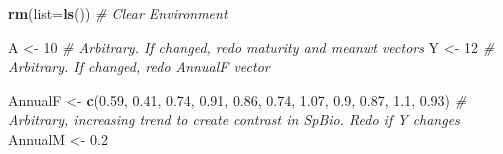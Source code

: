 \documentclass[
]{krantz}
\makeatletter
\newenvironment{Shaded}{\begin{snugshade}}{\end{snugshade}}
\newcommand{\AttributeTok}[1]{\textcolor[rgb]{0.27,0.27,0.27}{#1}}
\newcommand{\CommentTok}[1]{\textcolor[rgb]{0.37,0.37,0.37}{\textit{#1}}}
\newcommand{\DecValTok}[1]{\textcolor[rgb]{0.06,0.06,0.06}{#1}}
\newcommand{\FloatTok}[1]{\textcolor[rgb]{0.06,0.06,0.06}{#1}}
\newcommand{\FunctionTok}[1]{\textcolor[rgb]{0.27,0.27,0.27}{\textbf{#1}}}
\newcommand{\NormalTok}[1]{#1}
\newcommand{\OtherTok}[1]{\textcolor[rgb]{0.37,0.37,0.37}{#1}}
\newenvironment{kframe}{%
\medskip{}
\setlength{\fboxsep}{.8em}
 \def\at@end@of@kframe{}%
 \ifinner\ifhmode%
  \def\at@end@of@kframe{\end{minipage}}%
  \begin{minipage}{\columnwidth}%
 \fi\fi%
 \def\FrameCommand##1{\hskip\@totalleftmargin \hskip-\fboxsep
 \colorbox{shadecolor}{##1}\hskip-\fboxsep
     \hskip-\linewidth \hskip-\@totalleftmargin \hskip\columnwidth}%
 \MakeFramed {\advance\hsize-\width
   \@totalleftmargin\z@ \linewidth\hsize
   \@setminipage}}%
 {\par\unskip\endMakeFramed%
 \at@end@of@kframe}
\renewenvironment{Shaded}{\begin{kframe}}{\end{kframe}}
\makeatother
\begin{document}
\begin{Shaded}
\begin{Highlighting}[]
\FunctionTok{rm}\NormalTok{(}\AttributeTok{list=}\FunctionTok{ls}\NormalTok{()) }\CommentTok{\# Clear Environment}

\NormalTok{A }\OtherTok{\textless{}{-}} \DecValTok{10} \CommentTok{\# Arbitrary. If changed, redo maturity and meanwt vectors}
\NormalTok{Y }\OtherTok{\textless{}{-}} \DecValTok{12} \CommentTok{\# Arbitrary. If changed, redo AnnualF vector}

\NormalTok{AnnualF }\OtherTok{\textless{}{-}} \FunctionTok{c}\NormalTok{(}\FloatTok{0.59}\NormalTok{, }\FloatTok{0.41}\NormalTok{, }\FloatTok{0.74}\NormalTok{, }\FloatTok{0.91}\NormalTok{, }\FloatTok{0.86}\NormalTok{, }\FloatTok{0.74}\NormalTok{, }\FloatTok{1.07}\NormalTok{, }\FloatTok{0.9}\NormalTok{, }\FloatTok{0.87}\NormalTok{, }\FloatTok{1.1}\NormalTok{, }\FloatTok{0.93}\NormalTok{)}
\CommentTok{\# Arbitrary, increasing trend to create contrast in SpBio. Redo if Y changes}
\NormalTok{AnnualM }\OtherTok{\textless{}{-}} \FloatTok{0.2}


\end{Highlighting}
\end{Shaded}
\end{document}
